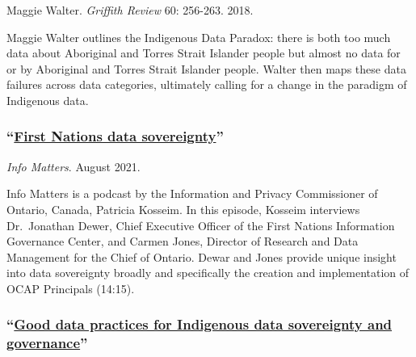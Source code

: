\documentclass[
]{book}
\begin{document}
Maggie Walter. \emph{Griffith Review} 60: 256-263. 2018.

Maggie Walter outlines the Indigenous Data Paradox: there is both too much data about Aboriginal and Torres Strait Islander people but almost no data for or by Aboriginal and Torres Strait Islander people. Walter then maps these data failures across data categories, ultimately calling for a change in the paradigm of Indigenous data.

\hypertarget{first-nations-data-sovereignty}{%
\subsubsection*{\texorpdfstring{``\href{https://open.spotify.com/episode/7lpJvcWPEX0DJcMjQPTdiK?si=r3AfZ-SbQeu3KrMtPbK6cQ}{First Nations data sovereignty}''}{``First Nations data sovereignty''}}\label{first-nations-data-sovereignty}}

\emph{Info Matters}. August 2021.

Info Matters is a podcast by the Information and Privacy Commissioner of Ontario, Canada, Patricia Kosseim. In this episode, Kosseim interviews Dr.~Jonathan Dewer, Chief Executive Officer of the First Nations Information Governance Center, and Carmen Jones, Director of Research and Data Management for the Chief of Ontario. Dewar and Jones provide unique insight into data sovereignty broadly and specifically the creation and implementation of OCAP Principals (14:15).

\hypertarget{good-data-practices-for-indigenous-data-sovereignty-and-governance}{%
\subsubsection*{\texorpdfstring{``\href{https://books.google.com/books?hl=en\&lr=\&id=Y0vUDwAAQBAJ\&oi=fnd\&pg=PA26\&dq=Good+data+practices+for+Indigenous+data+sovereignty+and+governance\&ots=hr9XhjlbCh\&sig=QKNc1PnCBYMO2s1mHYWbRg6g_GU\#v=onepage\&q=Good\%20data\%20practices\%20for\%20Indigenous\%20data\%20sovereignty\%20and\%20governance\&f=false}{Good data practices for Indigenous data sovereignty and governance}''}{``Good data practices for Indigenous data sovereignty and governance''}}\label{good-data-practices-for-indigenous-data-sovereignty-and-governance}}
\end{document}
